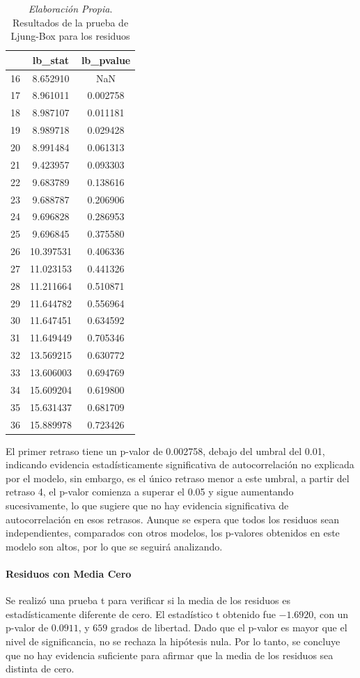 \documentclass[12pt,letterpaper]{article}   %
\begin{document}
\begin{table}[ht]
\footnotesize
\centering
\begin{tabular}{ccc}
\hline
\textbf{} & \textbf{lb\_stat} & \textbf{lb\_pvalue} \\
\hline
16 & 8.652910 & NaN \\
17 & 8.961011 & 0.002758 \\
18 & 8.987107 & 0.011181 \\
19 & 8.989718 & 0.029428 \\
20 & 8.991484 & 0.061313 \\
21 & 9.423957 & 0.093303 \\
22 & 9.683789 & 0.138616 \\
23 & 9.688787 & 0.206906 \\
24 & 9.696828 & 0.286953 \\
25 & 9.696845 & 0.375580 \\
26 & 10.397531 & 0.406336 \\
27 & 11.023153 & 0.441326 \\
28 & 11.211664 & 0.510871 \\
29 & 11.644782 & 0.556964 \\
30 & 11.647451 & 0.634592 \\
31 & 11.649449 & 0.705346 \\
32 & 13.569215 & 0.630772 \\
33 & 13.606003 & 0.694769 \\
34 & 15.609204 & 0.619800 \\
35 & 15.631437 & 0.681709 \\
36 & 15.889978 & 0.723426 \\
\hline
\end{tabular}
\caption{\textit{Elaboración Propia}. Resultados de la prueba de Ljung-Box para los residuos}
\end{table}

El primer retraso tiene un  p-valor de 0.002758, debajo del umbral del 0.01, indicando evidencia estadísticamente significativa de autocorrelación no explicada por el modelo, sin embargo, es el único retraso menor a este umbral, a partir del retraso 4, el p-valor comienza a superar el 0.05 y sigue aumentando sucesivamente, lo que sugiere que no hay evidencia significativa de autocorrelación en esos retrasos. Aunque se espera que todos los residuos sean independientes, comparados con otros modelos, los p-valores obtenidos en este modelo son altos, por lo que se seguirá analizando.


\paragraph{Residuos con Media Cero}
Se realizó una prueba t para verificar si la media de los residuos es estadísticamente diferente de cero. El estadístico t obtenido fue $-1.6920$, con un p-valor de $0.0911$, y $659$ grados de libertad. Dado que el p-valor es mayor que el nivel de significancia, no se rechaza la hipótesis nula. Por lo tanto, se concluye que no hay evidencia suficiente para afirmar que la media de los residuos sea distinta de cero.
\end{document}
